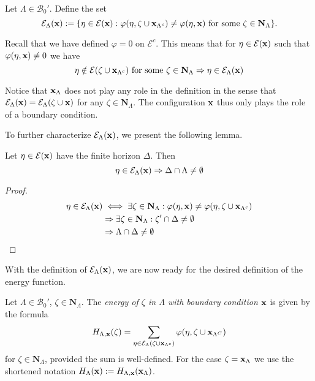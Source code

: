 \begin{definition}\label{def:Eset} Let $\Lambda \in \mathcal B_0'$. Define the set 
	$$\mathcal E_\Lambda({\mathbf{x}}) := \{ \eta \in \mathcal E({\mathbf{x}}): \varphi(\eta,\zeta \cup {\mathbf{x}}_{\Lambda^c}) \neq \varphi(\eta,{\mathbf{x}}) \text{ for some } \zeta \in \mathbf N_\Lambda \}.$$
\end{definition}

Recall that we have defined $\varphi=0$ on $\mathcal E^c$. This means that for $\eta \in \mathcal E({\mathbf{x}})$ such that $\varphi(\eta,{\mathbf{x}})\neq 0$ we have
$$\eta \notin \mathcal E(\zeta \cup {\mathbf{x}}_{\Lambda^c})\text{ for some }\zeta \in \mathbf N_{\Lambda} \Rightarrow \eta \in \mathcal E_{\Lambda}({\mathbf{x}})$$ 

Notice that ${\mathbf{x}}_\Lambda$ does not play any role in the definition in the sense that $\mathcal E_\Lambda({\mathbf{x}})=\mathcal E_\Lambda(\zeta \cup {\mathbf{x}})$ for any $\zeta \in \mathbf N_\Lambda$. The configuration ${\mathbf{x}}$ thus only plays the role of a boundary condition.

To further characterize $\mathcal E_\Lambda({\mathbf{x}})$, we present the following lemma.
\begin{lemma}\label{lemma:horizEset}Let $\eta \in \mathcal E({\mathbf{x}})$ have the finite horizon $\Delta$. Then
	$$\eta \in \mathcal E_\Lambda({\mathbf{x}}) \Rightarrow \Delta \cap \Lambda \neq \emptyset$$
\end{lemma}
\begin{proof}
	\begin{align*}
		\eta \in \mathcal E_\Lambda({\mathbf{x}}) & \iff \exists \zeta \in \mathbf N_\Lambda: \varphi(\eta,{\mathbf{x}}) \neq \varphi(\eta,\zeta \cup {\mathbf{x}}_{\Lambda^c}) \\
			& \Rightarrow \exists \zeta \in \mathbf N_\Lambda: \zeta' \cap \Delta \neq \emptyset \\
			& \Rightarrow \Lambda \cap \Delta \neq \emptyset
	\end{align*}
\end{proof}


With the definition of $\mathcal E_\Lambda({\mathbf{x}})$, we are now ready for the desired definition of the energy function.

\begin{definition}\label{def:energy}
	Let $\Lambda \in \mathcal B_0'$, $\zeta \in \mathbf N_\Lambda$. The \textit{energy of $\zeta$ in $\Lambda$ with boundary condition ${\mathbf{x}}$} is given by the formula
$$H_{\Lambda,{\mathbf{x}}}(\zeta) = \sum_{\eta \in \mathcal E_\Lambda(\zeta \cup {\mathbf{x}}_{\Lambda^c})} \varphi(\eta, \zeta \cup {\mathbf{x}}_{\Lambda^C})$$
for $\zeta \in \mathbf N_{\Lambda}$, provided the sum is well-defined. \newline
For the case $\zeta = {\mathbf{x}}_\Lambda$ we use the shortened notation $H_\Lambda({\mathbf{x}}):=H_{\Lambda,{\mathbf{x}}}({\mathbf{x}}_\Lambda)$.
\end{definition}


